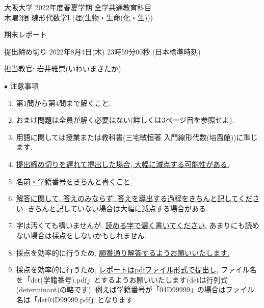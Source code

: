 \documentclass[dvipdfmx,a4paper,11pt]{article}
\theoremstyle{definition}
\begin{document}
\begin{center}
{ \large 大阪大学 2022年度春夏学期 全学共通教育科目 \\ 木曜2限 線形代数学I (理(生物・生命(化・生)))} \\
\vspace{5pt}

{\LARGE 期末レポート } \\
\vspace{5pt}

{ \Large 提出締め切り 2022年8月4日(木) 23時59分00秒 (日本標準時刻)}
\end{center}

\begin{flushright}
 担当教官: 岩井雅崇(いわいまさたか) 
\end{flushright}

{\Large $\bullet$ 注意事項}
\begin{enumerate}
\item 第1問から第4問まで解くこと. 
\item おまけ問題は全員が解く必要はない(詳しくは3ページ目を参照せよ).
\item 用語に関しては授業または教科書(三宅敏恒著 入門線形代数(培風館))に準じます.
\item \underline{提出締め切りを遅れて提出した場合, 大幅に減点する可能性がある.}
\item \underline{名前・学籍番号をきちんと書くこと.}
\item \underline{解答に関して, 答えのみならず, 答えを導出する過程をきちんと記してください.} きちんと記していない場合は大幅に減点する場合がある.
\item 字は汚くても構いませんが, \underline{読める字で濃く書いてください.} あまりにも読めない場合は採点をしないかもしれません.%
\item 採点を効率的に行うため, \underline{順番通り解答するようお願いいたします.}
\item 採点を効率的に行うため,  \underline{レポートはpdfファイル形式で提出し,} ファイル名を「det(学籍番号).pdf」とするようお願いいたします(detは行列式(determinant)の略です).
例えば学籍番号が「04D99999」の場合はファイル名は「det04D99999.pdf」となります.
\end{enumerate}
\end{document}

